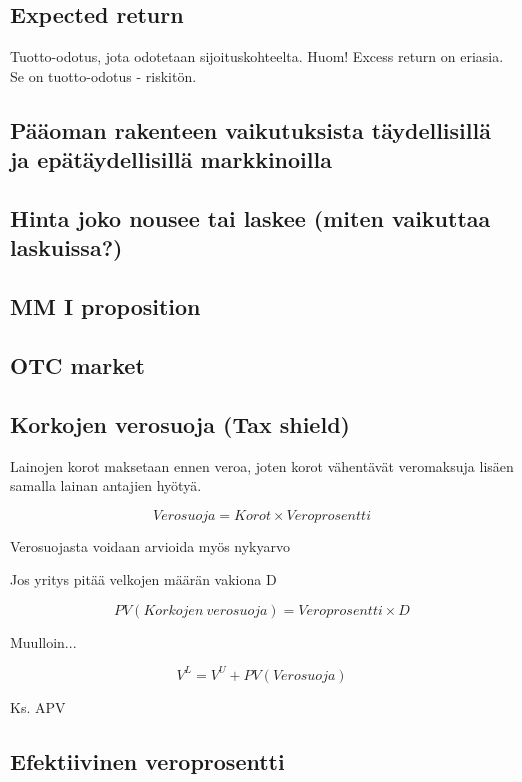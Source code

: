 \documentclass[a4paper]{article}
\begin{document}
\subsection{Expected return}

Tuotto-odotus, jota odotetaan sijoituskohteelta. Huom! Excess return on eriasia. Se on tuotto-odotus - riskitön.

\subsection{Pääoman rakenteen vaikutuksista täydellisillä ja epätäydellisillä markkinoilla}

\subsection{Hinta joko nousee tai laskee (miten vaikuttaa laskuissa?)}


\subsection{MM I proposition}

\subsection{OTC market}

\subsection{Korkojen verosuoja (Tax shield)}

Lainojen korot maksetaan ennen veroa, joten korot vähentävät veromaksuja lisäen samalla lainan antajien hyötyä.

\[ Verosuoja = Korot \times Veroprosentti \]

Verosuojasta voidaan arvioida myös nykyarvo

Jos yritys pitää velkojen määrän vakiona D

\[ PV(Korkojen\ verosuoja) = Veroprosentti \times D \]

Muulloin...

\[ V^L = V^U + PV(Verosuoja) \]

Ks. APV

\subsection{Efektiivinen veroprosentti}
\end{document}
